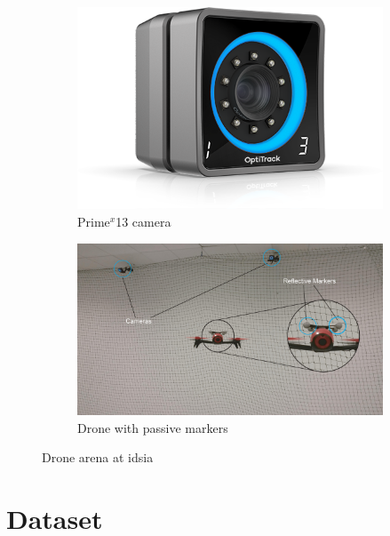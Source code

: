 \begin{figure}[!htb]
	\begin{center}
		\begin{subfigure}[h]{0.29\textwidth}
			\centering
			\includegraphics[width=1\textwidth]{"contents/images/03-optitrack-camera"}
			\caption[]{Prime$^x$13 camera}
			\label{fig:optitrack-camera}
		\end{subfigure}
		\hfill
		\begin{subfigure}[h]{0.69\textwidth}
			\centering
			\includegraphics[width=1\textwidth]{"contents/images/03-arena"}
			\caption[]{Drone with passive markers \cite{mantegazza2018thesis}}
			\label{fig:drone-arena}
		\end{subfigure}
	\end{center}
	\vspace{-0.5cm}
	\caption[Drone arena at \gls{idsia}]{Drone arena at \gls{idsia}}
\end{figure}



\section{Dataset}
\label{sec:dataset}

